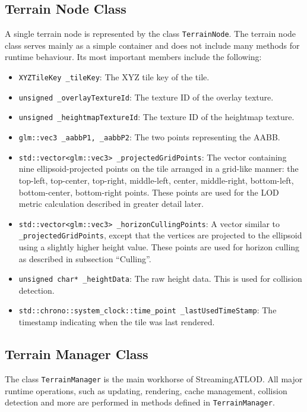 \subsection{Terrain Node Class}
A single terrain node is represented
by the class \texttt{TerrainNode}. The terrain node class serves mainly 
as a simple container and does not include many methods
for runtime behaviour.
Its most important members include the following:
\begin{itemize}
  \item \texttt{XYZTileKey \_tileKey}: The XYZ tile key of the tile.
  \item \texttt{unsigned \_overlayTextureId}: The texture ID of the overlay texture.
  \item \texttt{unsigned \_heightmapTextureId}: The texture ID of the heightmap texture.
  \item \texttt{glm::vec3 \_aabbP1, \_aabbP2}: The two points representing the AABB.
  \item \texttt{std::vector<glm::vec3> \_projectedGridPoints}: The vector containing nine ellipsoid-projected points on the tile arranged in a grid-like manner:
        the top-left, top-center, top-right, middle-left, center, middle-right, bottom-left, bottom-center, bottom-right points.
        These points are used for the LOD metric calculation described in greater detail later.
  \item \texttt{std::vector<glm::vec3> \_horizonCullingPoints}: A vector similar to \texttt{\_projectedGridPoints}, except 
        that the vertices are projected to the ellipsoid using a slightly higher height value. These points 
        are used for horizon culling as described in subsection ``Culling''.
  \item \texttt{unsigned char* \_heightData}: The raw height data. This is used for collision detection.
  \item \texttt{std::chrono::system\_clock::time\_point \_lastUsedTimeStamp}: The timestamp indicating when the tile was last rendered.
\end{itemize}

\subsection{Terrain Manager Class}
The class \texttt{TerrainManager} is the main workhorse of 
StreamingATLOD. All major runtime operations, such as 
updating, rendering, cache management, collision detection and more are performed in 
methods defined in \texttt{TerrainManager}.

